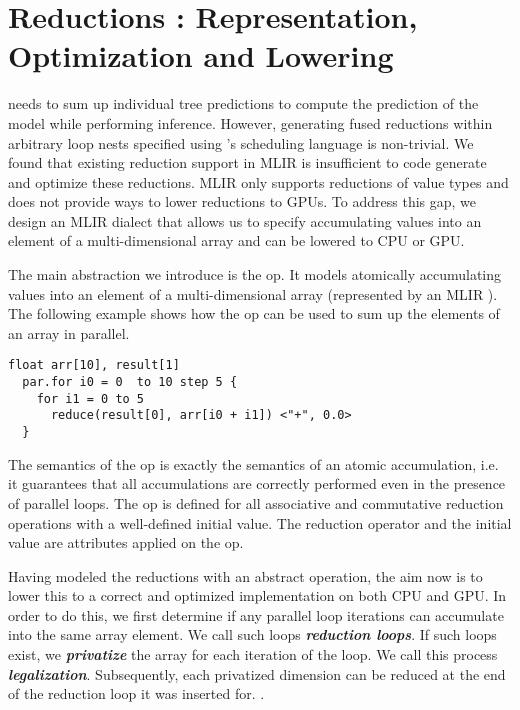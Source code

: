 \section{Reductions : Representation, Optimization and Lowering}
\label{sec:reduction}
\Treebeard{} needs to sum up individual tree predictions to compute 
the prediction of the model while performing inference. However,
generating fused reductions within arbitrary loop nests specified 
using \Treebeard{}'s scheduling language is non-trivial. We found 
that existing reduction support in MLIR is insufficient to code
generate and optimize these reductions. MLIR only supports reductions
of value types and does not provide ways to lower reductions to GPUs. 
To address this gap, we design an MLIR dialect that allows us to
specify accumulating values into an element of a multi-dimensional array
and can be lowered to CPU or GPU. 

The main abstraction we introduce is the  op. It models 
atomically accumulating values into an element of a 
multi-dimensional array (represented by an MLIR ).
The following example shows how the  op can be used to 
sum up the elements of an array in parallel.

\begin{lstlisting}[style=c++]
  float arr[10], result[1]
  par.for i0 = 0  to 10 step 5 {
    for i1 = 0 to 5 
      reduce(result[0], arr[i0 + i1]) <"+", 0.0>
  }
\end{lstlisting}

The semantics of the  op is exactly the semantics of 
an atomic accumulation, i.e. it guarantees that all accumulations 
are correctly performed even in the presence of parallel loops. 
The  op is defined for all associative and commutative
reduction operations with a well-defined initial value. The 
reduction operator and the initial value are attributes applied
on the  op. 

Having modeled the reductions with an abstract operation, the 
aim now is to lower this to a correct and optimized 
implementation on both CPU and GPU. In order to do this, we 
first determine if any parallel loop iterations can accumulate 
into the same array element. We call such loops 
\emph{\textbf{reduction loops}}. If such loops exist, we 
\textbf{\emph{privatize}} the array for each iteration of the
loop. We call this process \textbf{\emph{legalization}}.
Subsequently, each privatized dimension 
can be reduced at the end of the reduction loop it was inserted for. 
 .


